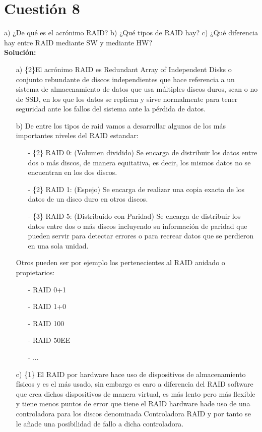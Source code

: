 \documentclass[a4paper, 11pt]{article} %
\begin{document}
\section{Cuestión 8}
a) ¿De qué es el acrónimo RAID? b) ¿Qué tipos de RAID hay? c) ¿Qué diferencia hay entre RAID mediante SW y mediante HW?\\
\textbf{Solución:}\\
\begin{itemize}
\item[a)] \{2\}El acrónimo RAID es Redundant Array of Independent Disks o conjunto rebundante de discos independientes que hace referencia a un sistema de almacenamiento de datos que usa múltiples discos duros, sean o no de SSD, en los que los datos se replican y sirve normalmente para tener seguridad ante los fallos del sistema ante la pérdida de datos.
\item[b)] De entre los tipos de raid vamos a desarrollar algunos de los más importantes niveles del RAID estandar:
	\begin{itemize}
	\item[-] \{2\} RAID 0: (Volumen dividido) Se encarga de distribuir los datos entre dos o más discos, de manera equitativa, es decir, los mismos datos no se encuentran en los dos discos.
	\item[-] \{2\} RAID 1: (Espejo) Se encarga de realizar una copia exacta de los datos de un disco duro en otros discos. 
	\item[-] \{3\} RAID 5: (Distribuido con Paridad) Se encarga de distribuir los datos entre dos o más discos incluyendo su información de paridad que pueden servir para detectar errores o para recrear datos que se perdieron en una sola unidad.
	\end{itemize}
Otros pueden ser por ejemplo los pertenecientes al RAID anidado o propietarios:
	\begin{itemize}
	\item[-] RAID 0+1
	\item[-] RAID 1+0
	\item[-] RAID 100
	\item[-] RAID 50EE
	\item[-] ...
	\end{itemize}
\item[c)] \{1\} El RAID por hardware hace uso de dispositivos de almacenamiento físicos y es el más usado, sin embargo es caro a diferencia del RAID software que crea dichos dispositivos de manera virtual, es más lento pero más flexible y tiene menos puntos de error que tiene el RAID hardware hade uso de una controladora para los discos denominada Controladora RAID y por tanto se le añade una posibilidad de fallo a dicha controladora.
\end{itemize}
\end{document}

